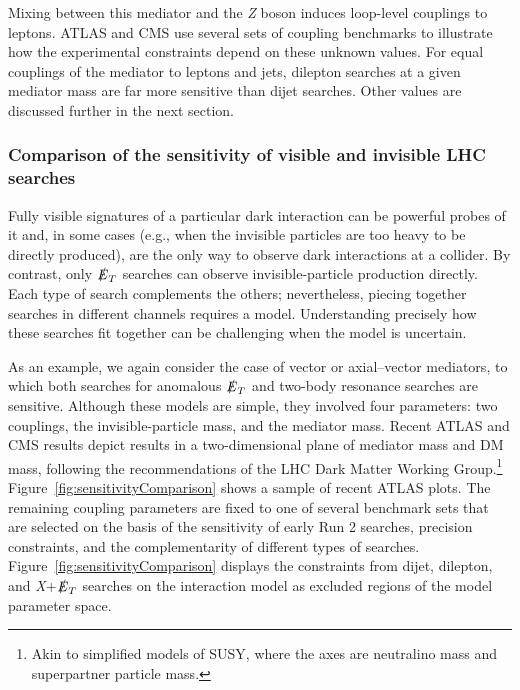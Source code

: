 \documentclass{ar-1col}
\newcommand{\IP}{invisible particle}
\newcommand{\MET}{\ensuremath{\slashed{E}_T}\xspace}
\begin{document}
{Mixing between this mediator and the \textit{Z} boson induces loop-level
couplings to leptons. ATLAS and CMS use several sets of coupling
benchmarks to illustrate how the experimental constraints depend
on these unknown values. For equal couplings of the mediator to
leptons and jets, dilepton searches at a given mediator mass are
far more sensitive than dijet searches. Other values are
discussed further in the next section.

\subsubsection{Comparison of the sensitivity of visible and invisible LHC searches}\label{sub:comparisonVisibleInvisible}

Fully visible signatures of a particular dark interaction can be
powerful probes of it and, in some cases (e.g., when the {\IP}s
are too heavy to be directly produced), are the only way to observe
dark interactions at a collider. By contrast, only \MET
searches can observe invisible-particle production directly.
Each type of search complements the others; nevertheless, piecing
together searches in different channels requires a model.
Understanding precisely how these searches fit together can be
challenging when the model is uncertain.

As an example, we again consider the case of vector or
axial--vector mediators, to which both searches for anomalous \MET and two-body
resonance searches are sensitive. Although these models are simple,
they involved four parameters: two couplings, the invisible-particle
mass, and the mediator mass. Recent ATLAS and CMS results depict
results in a two-dimensional plane of mediator mass and DM
mass, following the recommendations of the LHC Dark Matter Working
Group.\footnote{Akin to simplified models of SUSY, where the axes
are neutralino mass and superpartner particle mass.}
Figure~\ref{fig:sensitivityComparison} shows a sample of
recent ATLAS plots. The remaining coupling parameters are
fixed to one of several benchmark sets that are selected on the basis of the
sensitivity of early Run 2 searches, precision constraints, and
the complementarity of different types of searches. Figure~\ref{fig:sensitivityComparison} displays the
constraints from dijet, dilepton, and \textit{X}+\MET searches on the
interaction model as excluded regions of the model
parameter space.

}
\end{document}
